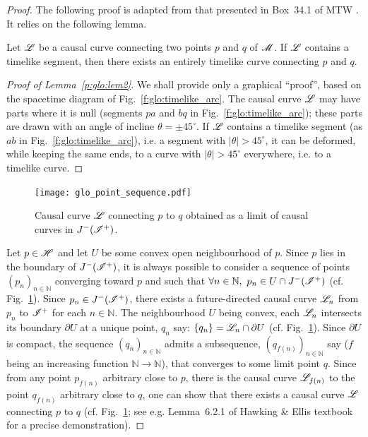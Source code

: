 \begin{proof}
The following proof is adapted from that presented in Box~34.1 of MTW \cite{MisneTW73}.
It relies on the following lemma.
\begin{lemma}
\label{p:glo:lem2}
Let $\mathscr{L}$ be a causal curve connecting two points $p$ and $q$
of $\mathscr{M}$. If $\mathscr{L}$ contains a timelike segment, then there exists an
entirely timelike curve connecting $p$ and $q$.
\end{lemma}
\begin{proof}[Proof of Lemma~\ref{p:glo:lem2}]
We shall provide only a graphical ``proof'', based on the spacetime diagram
of Fig.~\ref{f:glo:timelike_arc}. The causal curve $\mathscr{L}$ may have parts where it is null (segments $pa$ and $bq$ in Fig.~\ref{f:glo:timelike_arc}); these parts are drawn with
an angle of incline $\theta = \pm 45^\circ$.
If $\mathscr{L}$ contains a timelike segment (as $ab$ in Fig.~\ref{f:glo:timelike_arc}), i.e. a segment with $|\theta|>45^\circ$,
it can be deformed, while keeping the same ends, to a curve with $|\theta|>45^\circ$
everywhere, i.e. to a timelike curve.
\end{proof}


\begin{figure}
\centerline{\texttt{[image: glo\_point\_sequence.pdf]}}
\caption[]{\label{f:glo:point_sequence} \footnotesize
Causal curve $\mathscr{L}$ connecting $p$ to $q$ obtained as a limit of causal curves
in $J^-(\mathscr{I}^+)$.}
\end{figure}


Let $p\in\mathscr{H}$ and let $U$ be some convex open neighbourhood of $p$.
Since $p$ lies in the boundary of $J^-(\mathscr{I}^+)$, it is always possible to
consider
a sequence of points $(p_n)_{n\in\mathbb{N}}$ converging toward $p$
and such that $\forall n\in\mathbb{N},\ p_n \in U \cap J^-(\mathscr{I}^+)$
(cf. Fig.~\ref{f:glo:point_sequence}).
Since $p_n\in J^-(\mathscr{I}^+)$,
there exists a future-directed causal curve $\mathscr{L}_{n}$ from $p_n$ to $\mathscr{I}^+$
for each $n\in\mathbb{N}$.
The neighbourhood $U$ being convex, each $\mathscr{L}_n$ intersects its boundary $\partial U$
at a unique point, $q_n$ say: $\{q_n\}=\mathscr{L}_n \cap \partial U$
(cf. Fig.~\ref{f:glo:point_sequence}).
Since $\partial U$
is compact, the sequence $(q_n)_{n\in\mathbb{N}}$ admits a subsequence,
$(q_{f(n)})_{n\in\mathbb{N}}$ say ($f$ being an increasing
function $\mathbb{N}\rightarrow\mathbb{N}$),
that converges to some limit point $q$.
Since from any point $p_{f(n)}$ arbitrary close to $p$, there is
the causal curve $\mathscr{L}_{f(n)}$ to the point $q_{f(n)}$ arbitrary close to $q$,
one can show that
there exists a causal curve $\mathscr{L}$ connecting $p$ to $q$
(cf. Fig.~\ref{f:glo:point_sequence}; see e.g.
Lemma~6.2.1 of Hawking \& Ellis textbook \cite{HawkiE73}
for a precise demonstration).


\end{proof}
